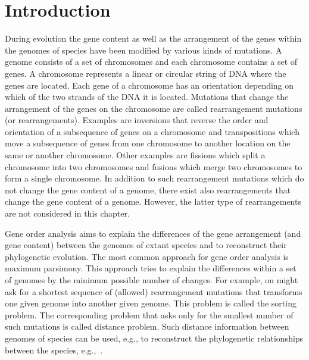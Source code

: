 \documentclass{svmult}
\begin{document}
\maketitle



\section{Introduction}

During evolution the gene content as well as the arrangement of the genes within the genomes of species 
have been modified by various kinds of mutations. 
A genome consists of a set of chromosomes and each chromosome contains a set of genes. A chromosome represents 
a linear or circular string of DNA where the genes are located. Each gene of a chromosome has an orientation 
depending on which of the two strands of the DNA it is located. 
Mutations that change the arrangement of the genes on the
chromosome are called rearrangement mutations (or rearrangements). Examples are inversions that reverse the order and orientation 
of a subsequence of genes on a chromosome and transpositions 
which move a subsequence of genes from one chromosome to another location on the same or another chromosome.
Other examples are fissions which split a chromosome into two chromosomes and fusions which merge two chromosomes to form a 
single chromosome. In addition to such rearrangement mutations which do not change the gene content of a genome, there exist also 
rearrangements that change the gene content of a genome. However,
the latter type of rearrangements are not considered in this chapter.

Gene order analysis aims to explain the differences of the gene arrangement (and gene content) between the genomes of extant species 
and to reconstruct their phylogenetic evolution. The most common approach for
gene order analysis is maximum parsimony. This approach tries to explain the differences within a set of genomes by the minimum
possible number of changes. For example, on might ask for a shortest sequence of
(allowed) rearrangement mutations that transforms one given genome into another
given genome. This problem is called the sorting problem. The corresponding
problem that asks only for the smallest number of such mutations is called
distance problem. 
Such distance information between genomes of species can be used, e.g., to
reconstruct the phylogenetic relationships between the species, 
e.g.,~\cite{Wang_2006}.
\end{document}
